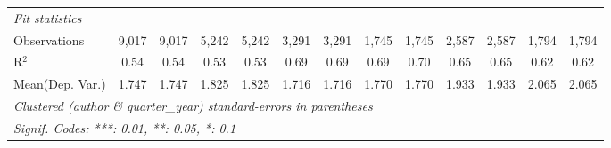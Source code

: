 \begin{tabular}{lcccccccccccc}
   \midrule
   \emph{Fit statistics}\\
   Observations                             & 9,017        & 9,017          & 5,242        & 5,242          & 3,291   & 3,291         & 1,745   & 1,745         & 2,587        & 2,587         & 1,794   & 1,794\\  
   R$^2$                                    & 0.54         & 0.54           & 0.53         & 0.53           & 0.69    & 0.69          & 0.69    & 0.70          & 0.65         & 0.65          & 0.62    & 0.62\\  
Mean(Dep. Var.) & 1.747 & 1.747 & 1.825 & 1.825 & 1.716 & 1.716 & 1.770 & 1.770 & 1.933 & 1.933 & 2.065 & 2.065 \\
   \midrule \midrule
   \multicolumn{13}{l}{\emph{Clustered (author \& quarter\_year) standard-errors in parentheses}}\\
   \multicolumn{13}{l}{\emph{Signif. Codes: ***: 0.01, **: 0.05, *: 0.1}}\\
\end{tabular}
\par\endgroup
